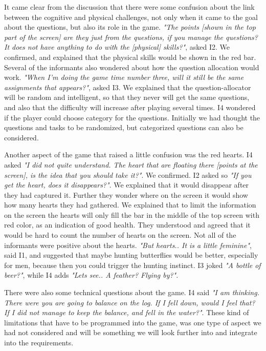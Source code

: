 It came clear from the discussion that there were some confusion about the link between the cognitive and physical challenges, not only when it came to the goal about the questions, but also its role in the game. \emph{"The points [shown in the top part of the screen] are they just from the questions, if you manage the questions? It does not have anything to do with the [physical] skills?"}, asked I2. We confirmed, and explained that the physical skills would be shown in the red bar. Several of the informants also wondered about how the question allocation would work.  \emph{"When I'm doing the game time number three, will it still be the same assignments that appears?"}, asked I3. We explained that the question-allocator will be random and intelligent, so that they never will get the same questions, and also that the difficulty will increase after playing several times. I4 wondered if the player could choose category for the questions. Initially we had thought the questions and tasks to be randomized, but categorized questions can also be considered. 

Another aspect of the game that raised a little confusion was the red hearts. I4 asked \emph{"I did not quite understand. The heart that are floating there [points at the screen], is the idea that you should take it?"}. We confirmed. I2 asked so \emph{"If you get the heart, does it disappears?"}. We explained that it would disappear after they had captured it. Further they wonder where on the screen it would show how many hearts they had gathered. We explained that to limit the information on the screen the hearts will only fill the bar in the middle of the top screen with red color, as an indication of good health. They understood and agreed that it would be hard to count the number of hearts on the screen. Not all of the informants were positive about the hearts. \emph{"But hearts.. It is a little feminine"}, said I1, and suggested that maybe hunting butterflies would be better, especially for men, because then you could trigger the hunting instinct. I3 joked \emph{"A bottle of beer?"}, while I4 adds \emph{"Lets see.. A feather? Flying by?"}. 

There were also some technical questions about the game. I4 said \emph{"I am thinking. There were you are going to balance on the log. If I fell down, would I feel that? If I did not manage to keep the balance, and fell in the water?"}. These kind of limitations that have to be programmed into the game, was one type of aspect we had not considered and will be something we will look further into and integrate into the requirements. 

